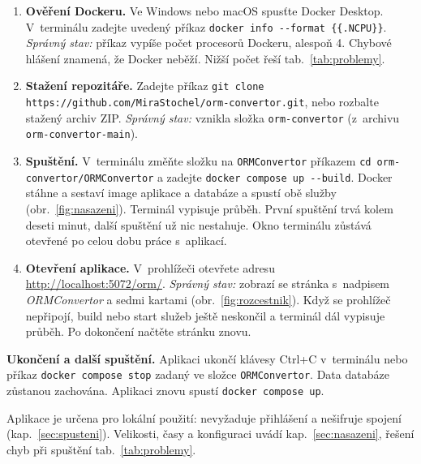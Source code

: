 \begin{enumerate}[leftmargin=*,itemsep=2pt]
\item \textbf{Ověření Dockeru.} Ve Windows nebo macOS spusťte Docker Desktop. V~terminálu zadejte uvedený příkaz \texttt{docker info -{}-format \textquotesingle\{\{.NCPU\}\}\textquotesingle}. \emph{Správný stav:} příkaz vypíše počet procesorů Dockeru, alespoň 4. Chybové hlášení znamená, že Docker neběží. Nižší počet řeší tab.~\ref{tab:problemy}.
\item \textbf{Stažení repozitáře.} Zadejte příkaz \texttt{git clone https://github.com/MiraStochel/orm-convertor.git}, nebo rozbalte stažený archiv ZIP. \emph{Správný stav:} vznikla složka \texttt{orm-convertor} (z~archivu \texttt{orm-convertor-main}).
\item \textbf{Spuštění.} V~terminálu změňte složku na \texttt{ORMConvertor} příkazem \texttt{cd orm-convertor/ORMConvertor} a zadejte \texttt{docker compose up -{}-build}. Docker stáhne a sestaví image aplikace a databáze a spustí obě služby (obr.~\ref{fig:nasazeni}). Terminál vypisuje průběh. První spuštění trvá kolem deseti minut, další spuštění už nic nestahuje. Okno terminálu zůstává otevřené po celou dobu práce s~aplikací.
\item \textbf{Otevření aplikace.} V~prohlížeči otevřete adresu \url{http://localhost:5072/orm/}. \emph{Správný stav:} zobrazí se stránka s~nadpisem \emph{ORMConvertor} a sedmi kartami (obr.~\ref{fig:rozcestnik}). Když se prohlížeč nepřipojí, build nebo start služeb ještě neskončil a terminál dál vypisuje průběh. Po dokončení načtěte stránku znovu.
\end{enumerate}


\renewcommand{\snimekkde}{H}

\textbf{Ukončení a další spuštění.} Aplikaci ukončí klávesy Ctrl+C v~terminálu nebo příkaz \texttt{docker compose stop} zadaný ve složce \texttt{ORMConvertor}. Data databáze zůstanou zachována. Aplikaci znovu spustí \texttt{docker compose up}.

Aplikace je určena pro lokální použití: nevyžaduje přihlášení a nešifruje spojení (kap.~\ref{sec:spusteni}). Velikosti, časy a konfiguraci uvádí kap.~\ref{sec:nasazeni}, řešení chyb při spuštění tab.~\ref{tab:problemy}.

